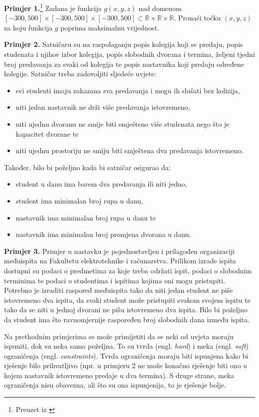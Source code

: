 \documentclass[times, utf8, zavrsni]{fer}
\begin{document}
\textbf{Primjer 1.}\footnote{Preuzet iz \citep{cupic2013prirodom}}
Zadana je funkcija $g(x, y, z)$ nad domenom $[-300, 500] \times [-300, 500] \times [-300, 500] \subset
\mathbb{R} \times \mathbb{R} \times \mathbb{R}$. Pronaći točku $(x, y, z)$ za koju funkcija $g$ poprima maksimalnu vrijednost.

\textbf{Primjer 2.} Satničaru su na raspolaganju popis kolegija koji se predaju, popis studenata i njihov izbor kolegija, popis slobodnih dvorana i termina,
željeni tjedni broj predavanja za svaki od kolegija te popis nastavnika koji predaju određene kolegije. Satničar treba zadovoljiti
sljedeće uvjete:
  \begin{itemize}
    \item svi studenti imaju zakazana sva predavanja i mogu ih slušati bez kolizija,
    \item niti jedan nastavnik ne drži više predavanja istovremeno,
    \item niti ujednu dvoranu ne smije biti smješteno više studenata nego što je kapacitet dvorane te
    \item niti ujednu prostoriju ne smiju biti smještena dva predavanja istovremeno.
  \end{itemize}
Također, bilo bi poželjno kada bi satničar osigurao da:
\begin{itemize}
  \item student u danu ima barem dva predavanja ili niti jedno,
  \item student ima minimalan broj rupa u danu,
  \item nastavnik ima minimalan broj rupa u danu te
  \item nastavnik ima minimalan broj promjena dvorana u danu.
\end{itemize}

\textbf{Primjer 3.}
Primjer u nastavku je pojednostavljen i prilagođen organizaciji međuispita na Fakultetu elektrotehnike i računarstva.
Prilikom izrade ispita dostupni su podaci o predmetima za koje treba održati ispit, podaci o slobodnim terminima te
podaci o studentima i ispitima kojima oni mogu pristupiti. Potrebno je izraditi raspored međuispita tako da niti jedan
student ne piše istovremeno dva ispita, da svaki student može pristupiti svakom svojem ispitu
te tako da se niti u jednoj dvorani ne pišu istovremeno dva ispita. Bilo bi poželjno
da student ima što ravnomjernije raspoređen broj slobodnih dana između ispita.

Na prethodnim primjerima se može primijetiti da se neki od uvjeta moraju ispuniti, dok su neka samo poželjna. To su tvrda
(engl. \textit{hard}) i meka (engl. \textit{soft}) ograničenja (engl. \textit{constraints}). Tvrda ograničenja moraju biti ispunjena kako bi rješenje bilo prihvatljivo (npr. u primjeru 2 ne može konačno rješenje biti ono u kojem nastavnik istovremeno predaje u dva termina). S druge strane, meka ograničenja nisu obavezna, ali što su ona ispunjenija, to je rješenje bolje.
\end{document}
